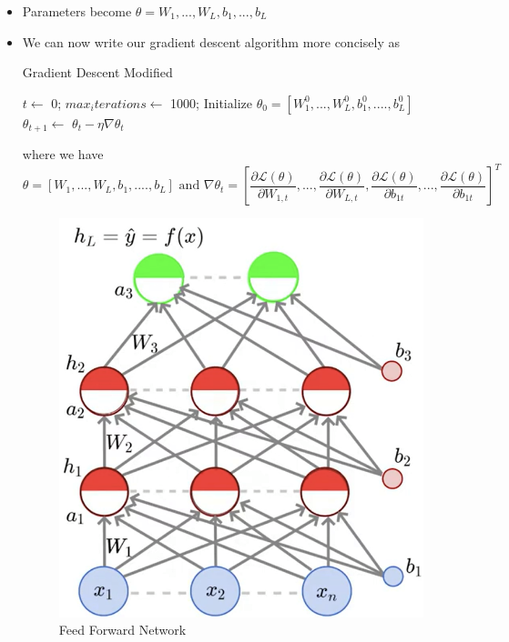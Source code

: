 \documentclass[a4paper]{article}
\begin{document}
\begin{itemize}
    \item Parameters become $\theta=W_1,...,W_L,b_1,...,b_L$
    \item We can now write our gradient descent algorithm more concisely as
    \begin{algorithm}[H]
        \caption{Gradient Descent Modified}\label{alg:DL-gradien-descent-modified}
        \begin{algorithmic}[1]
            \Statex {}
            \State $t\gets$ 0;
            \State $max_iterations\gets$ 1000;
            \State Initialize $\theta_0=[W_1^0,...,W_L^0,b_1^0,....,b_L^0]$
                \State $\theta_{t+1}\gets$ $\theta_t-\eta \nabla \theta_t$
            \EndWhile
        \end{algorithmic}
    \end{algorithm}
    where we have
    \begin{equation*}
        \theta=[W_1,...,W_L,b_1,....,b_L]\text{ and }\nabla \theta_t=[\frac{\partial \mathcal{L}(\theta)}{\partial W_{1,t}},...,\frac{\partial \mathcal{L}(\theta)}{\partial W_{L,t}},\frac{\partial \mathcal{L}(\theta)}{\partial b_{1t}},...,\frac{\partial \mathcal{L}(\theta)}{\partial b_{1t}}]^T
    \end{equation*}
    \begin{figure}[H]
        \centering
        \includegraphics[width=0.5\linewidth]{Degree//static/DL_Feedforward_network.png}
        \caption{Feed Forward Network}
        \label{fig:DL-feedforward-network}
    \end{figure}
\end{itemize}
\end{document}

